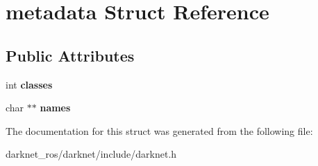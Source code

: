 \hypertarget{structmetadata}{}\section{metadata Struct Reference}
\label{structmetadata}
\subsection*{Public Attributes}
\begin{DoxyCompactItemize}
\item 
\mbox{\label{structmetadata_a79e09a60e76b3658018e342933715f69}} 
int {\bfseries classes}
\item 
\mbox{\label{structmetadata_aee443b3a2259ad9031259d20ddf79086}} 
char $\ast$$\ast$ {\bfseries names}
\end{DoxyCompactItemize}


The documentation for this struct was generated from the following file\+:\begin{DoxyCompactItemize}
\item 
darknet\+\_\+ros/darknet/include/darknet.\+h\end{DoxyCompactItemize}
